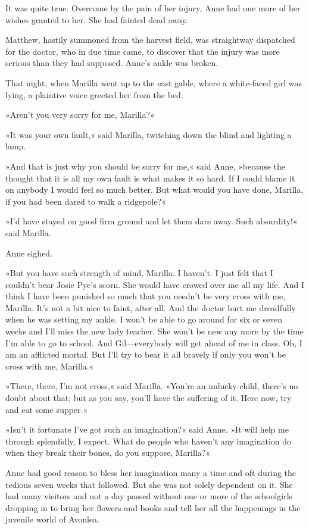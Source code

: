 It was quite true. Overcome by the pain of her injury, Anne had one more of her wishes granted to her. She had fainted dead away.

Matthew, hastily summoned from the harvest field, was straightway dispatched for the doctor, who in due time came, to discover that the injury was more serious than they had supposed. Anne's ankle was broken.

That night, when Marilla went up to the east gable, where a white-faced girl was lying, a plaintive voice greeted her from the bed.

»Aren't you very sorry for me, Marilla?«

»It was your own fault,« said Marilla, twitching down the blind and lighting a lamp.

»And that is just why you should be sorry for me,« said Anne, »because the thought that it is all my own fault is what makes it so hard. If I could blame it on anybody I would feel so much better. But what would you have done, Marilla, if you had been dared to walk a ridgepole?«

»I'd have stayed on good firm ground and let them dare away. Such absurdity!« said Marilla.

Anne sighed.

»But you have such strength of mind, Marilla. I haven't. I just felt that I couldn't bear Josie Pye's scorn. She would have crowed over me all my life. And I think I have been punished so much that you needn't be very cross with me, Marilla. It's not a bit nice to faint, after all. And the doctor hurt me dreadfully when he was setting my ankle. I won't be able to go around for six or seven weeks and I'll miss the new lady teacher. She won't be new any more by the time I'm able to go to school. And Gil—everybody will get ahead of me in class. Oh, I am an afflicted mortal. But I'll try to bear it all bravely if only you won't be cross with me, Marilla.«

»There, there, I'm not cross,« said Marilla. »You're an unlucky child, there's no doubt about that; but as you say, you'll have the suffering of it. Here now, try and eat some supper.«

»Isn't it fortunate I've got such an imagination?« said Anne. »It will help me through splendidly, I expect. What do people who haven't any imagination do when they break their bones, do you suppose, Marilla?«

Anne had good reason to bless her imagination many a time and oft during the tedious seven weeks that followed. But she was not solely dependent on it. She had many visitors and not a day passed without one or more of the schoolgirls dropping in to bring her flowers and books and tell her all the happenings in the juvenile world of Avonlea.

